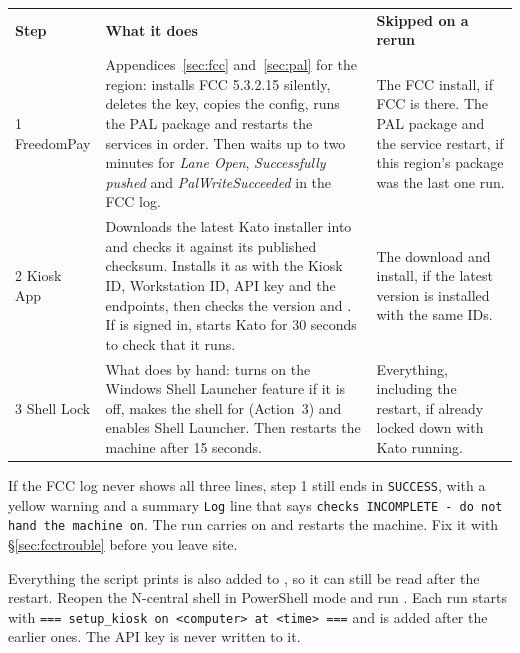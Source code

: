 \documentclass[a4paper,10pt]{article}
\begin{document}
\begin{center}
\renewcommand{\arraystretch}{1.35}\small
\begin{tabularx}{\textwidth}{L{20mm} X L{40mm}}
\color{white}\textbf{Step} &
\color{white}\textbf{What it does} &
\color{white}\textbf{Skipped on a rerun}\\
1 FreedomPay &
Appendices~\ref{sec:fcc} and~\ref{sec:pal} for the region: installs FCC 5.3.2.15 silently,
deletes the  key, copies the config, runs
the PAL package and restarts the services in order. Then waits up to two
minutes for \emph{Lane Open}, \emph{Successfully pushed} and
\emph{PalWriteSucceeded} in the FCC log. &
The FCC install, if FCC is there. The PAL package and the service
restart, if this region's package was the last one run.\\
2 Kiosk App &
Downloads the latest Kato installer into
 and checks it against its
published checksum. Installs it as  with the Kiosk ID,
Workstation ID, API key and the  endpoints,
then checks the version and . If
 is signed in, starts Kato for 30 seconds to check that
it runs. &
The download and install, if the latest version is installed with the
same IDs.\\
3 Shell Lock &
What  does by hand: turns on the Windows Shell Launcher
feature if it is off, makes  the shell for
 (Action~3) and enables Shell Launcher. Then restarts
the machine after 15 seconds. &
Everything, including the restart, if already locked down with Kato
running.\\
\end{tabularx}
\end{center}

\begin{wkwarn}
If the FCC log never shows all three lines, step 1 still ends in
\texttt{SUCCESS}, with a yellow warning and a summary \texttt{Log} line
that says \texttt{checks INCOMPLETE - do not hand the machine on}. The run
carries on and restarts the machine. Fix it with
\S\ref{sec:fcctrouble} before you leave site.
\end{wkwarn}

\begin{wkinfo}
Everything the script prints is also added to
, so it can still be read after
the restart. Reopen the N-central shell in PowerShell mode and run
. Each run
starts with \texttt{=== setup\_kiosk on <computer> at <time> ===} and is
added after the earlier ones. The API key is never written to it.
\end{wkinfo}
\end{document}
